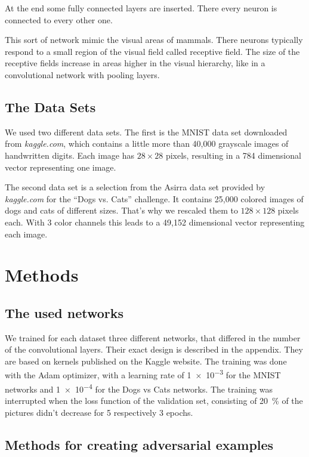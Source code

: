 \documentclass[%
 reprint,
 amsmath,amssymb,
 aps,
]{revtex4-1}
\begin{document}
At the end some fully connected layers are inserted. There every neuron is connected to every other one.

This sort of network mimic the visual areas of mammals. There neurons typically respond to a small region of the visual field called receptive field. The size of the receptive fields increase in areas higher in the visual hierarchy, like in a convolutional network with pooling layers.

\subsection{The Data Sets}

We used two different data sets. The first is the MNIST data set downloaded from \emph{kaggle.com}, which contains a little more than 40,000 grayscale images of handwritten digits. Each image has $28\times 28$ pixels, resulting in a 784 dimensional vector representing one image. 

The second data set is a selection from the Asirra data set provided by \emph{kaggle.com} for the ``Dogs vs. Cats'' challenge. It contains 25,000 colored images of dogs and cats of different sizes. That's why we rescaled them to $128\times 128$ pixels each. With 3 color channels this leads to a 49,152 dimensional vector representing each image. 
\section{Methods}

\subsection{The used networks}

We trained for each dataset three different networks, that differed in the number of the convolutional layers. Their exact design is described in the appendix. They are based on kernels published on the Kaggle website. The training was done with the Adam optimizer, with a learning rate of \SI{1e-3}{} for the MNIST networks and \SI{1e-4}{} for the Dogs vs Cats networks. The training was interrupted when the loss function of the validation set, consisting of \SI{20}{\percent} of the pictures didn't decrease for 5 respectively 3 epochs.



\subsection{Methods for creating adversarial examples}
\end{document}
